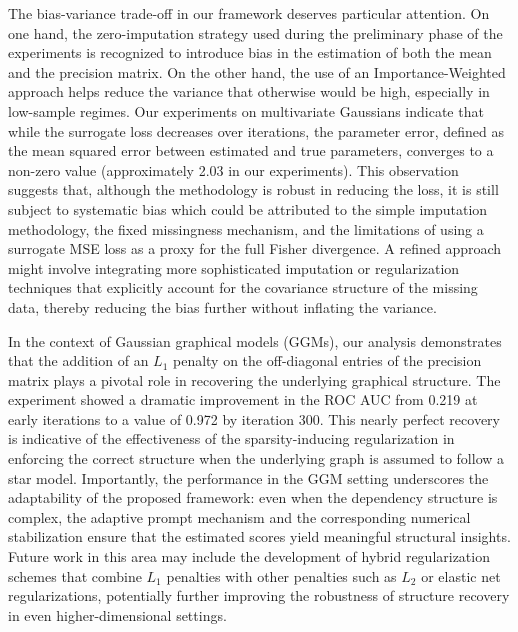 \documentclass{article}
\begin{document}
The bias-variance trade-off in our framework deserves particular attention. On one hand, the zero-imputation strategy used during the preliminary phase of the experiments is recognized to introduce bias in the estimation of both the mean and the precision matrix. On the other hand, the use of an Importance-Weighted approach helps reduce the variance that otherwise would be high, especially in low-sample regimes. Our experiments on multivariate Gaussians indicate that while the surrogate loss decreases over iterations, the parameter error, defined as the mean squared error between estimated and true parameters, converges to a non-zero value (approximately 2.03 in our experiments). This observation suggests that, although the methodology is robust in reducing the loss, it is still subject to systematic bias which could be attributed to the simple imputation methodology, the fixed missingness mechanism, and the limitations of using a surrogate MSE loss as a proxy for the full Fisher divergence. A refined approach might involve integrating more sophisticated imputation or regularization techniques that explicitly account for the covariance structure of the missing data, thereby reducing the bias further without inflating the variance.

In the context of Gaussian graphical models (GGMs), our analysis demonstrates that the addition of an \(L_1\) penalty on the off-diagonal entries of the precision matrix plays a pivotal role in recovering the underlying graphical structure. The experiment showed a dramatic improvement in the ROC AUC from 0.219 at early iterations to a value of 0.972 by iteration 300. This nearly perfect recovery is indicative of the effectiveness of the sparsity-inducing regularization in enforcing the correct structure when the underlying graph is assumed to follow a star model. Importantly, the performance in the GGM setting underscores the adaptability of the proposed framework: even when the dependency structure is complex, the adaptive prompt mechanism and the corresponding numerical stabilization ensure that the estimated scores yield meaningful structural insights. Future work in this area may include the development of hybrid regularization schemes that combine \(L_1\) penalties with other penalties such as \(L_2\) or elastic net regularizations, potentially further improving the robustness of structure recovery in even higher-dimensional settings.
\end{document}
